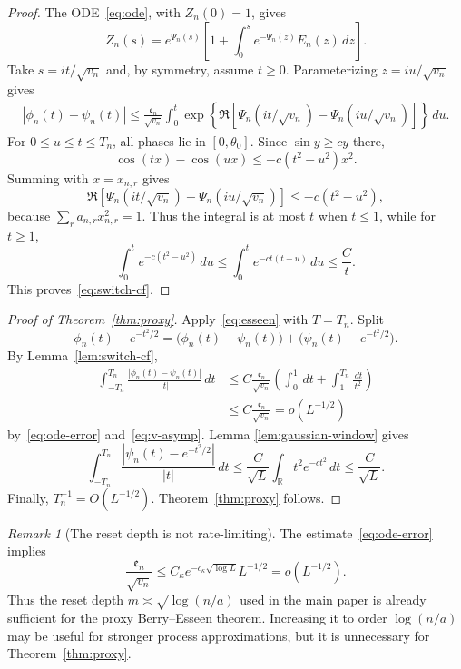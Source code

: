 \documentclass[11pt]{article}
\theoremstyle{remark}
\newtheorem{remark}[theorem]{Remark}
\newcommand{\dd}{\,d}
\begin{document}
\begin{proof}
The ODE~\eqref{eq:ode}, with $Z_n(0)=1$, gives
\[
 Z_n(s)=e^{\Psi_n(s)}
 \left[1+\int_0^s e^{-\Psi_n(z)}E_n(z)\dd z\right].
\]
Take $s=it/\sqrt{v_n}$ and, by symmetry, assume $t\ge0$.  Parameterizing
$z=iu/\sqrt{v_n}$ gives
\begin{align*}
 |\phi_n(t)-\psi_n(t)|
 \le\frac{\mathfrak e_n}{\sqrt{v_n}}
 \int_0^t
 \exp\left\{
 \Re\left[
 \Psi_n(it/\sqrt{v_n})-\Psi_n(iu/\sqrt{v_n})
 \right]\right\}\dd u.
\end{align*}
For $0\le u\le t\le T_n$, all phases lie in $[0,\theta_0]$.  Since
$\sin y\ge cy$ there,
\[
 \cos(tx)-\cos(ux)\le-c(t^2-u^2)x^2.
\]
Summing with $x=x_{n,r}$ gives
\[
 \Re\left[
 \Psi_n(it/\sqrt{v_n})-\Psi_n(iu/\sqrt{v_n})
 \right]
 \le-c(t^2-u^2),
\]
because $\sum_ra_{n,r}x_{n,r}^2=1$.  Thus the integral is at most $t$
when $t\le1$, while for $t\ge1$,
\[
 \int_0^t e^{-c(t^2-u^2)}\dd u
 \le\int_0^t e^{-ct(t-u)}\dd u
 \le\frac{C}{t}.
\]
This proves~\eqref{eq:switch-cf}.
\end{proof}

\begin{proof}[Proof of Theorem~\ref{thm:proxy}]
Apply~\eqref{eq:esseen} with $T=T_n$.  Split
\[
 \phi_n(t)-e^{-t^2/2}
 =\bigl(\phi_n(t)-\psi_n(t)\bigr)
 +\bigl(\psi_n(t)-e^{-t^2/2}\bigr).
\]
By Lemma~\ref{lem:switch-cf},
\begin{align*}
 \int_{-T_n}^{T_n}
 \frac{|\phi_n(t)-\psi_n(t)|}{|t|}\dd t
 &\le C\frac{\mathfrak e_n}{\sqrt{v_n}}
 \left(\int_0^1\dd t+\int_1^{T_n}\frac{\dd t}{t^2}\right)\\
 &\le C\frac{\mathfrak e_n}{\sqrt{v_n}}
 =o(L^{-1/2})
\end{align*}
by~\eqref{eq:ode-error} and~\eqref{eq:v-asymp}.  Lemma
\ref{lem:gaussian-window} gives
\[
 \int_{-T_n}^{T_n}
 \frac{|\psi_n(t)-e^{-t^2/2}|}{|t|}\dd t
 \le\frac{C}{\sqrt L}
 \int_{\mathbb R}t^2e^{-ct^2}\dd t
 \le\frac{C}{\sqrt L}.
\]
Finally, $T_n^{-1}=O(L^{-1/2})$.  Theorem~\ref{thm:proxy} follows.
\end{proof}

\begin{remark}[The reset depth is not rate-limiting]
The estimate~\eqref{eq:ode-error} implies
\[
 \frac{\mathfrak e_n}{\sqrt{v_n}}
 \le C_\kappa e^{-c_\kappa\sqrt{\log L}}L^{-1/2}
 =o(L^{-1/2}).
\]
Thus the reset depth $m\asymp\sqrt{\log(n/a)}$ used in the main paper is
already sufficient for the proxy Berry--Esseen theorem.  Increasing it to
order $\log(n/a)$ may be useful for stronger process approximations, but it
is unnecessary for Theorem~\ref{thm:proxy}.
\end{remark}
\end{document}

